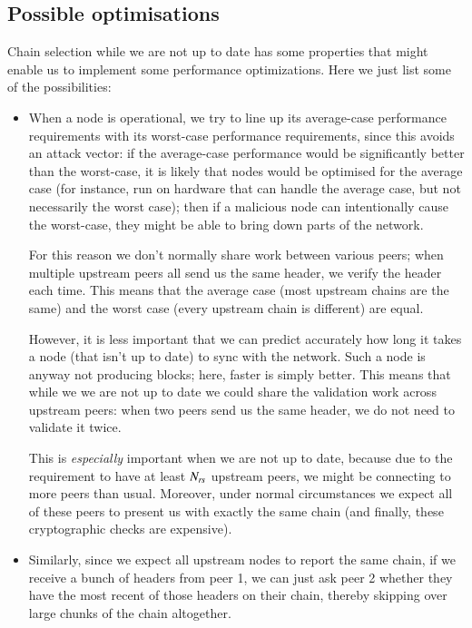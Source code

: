 \subsection{Possible optimisations}
\label{genesis:optimizations}

Chain selection while we are not up to date has some properties that might
enable us to implement some performance optimizations. Here we just list some of
the possibilities:

\begin{itemize}

\item When a node is operational, we try to line up its average-case performance
requirements with its worst-case performance requirements, since this avoids
an attack vector: if the average-case performance would be significantly better
than the worst-case, it is likely that nodes would be optimised for the average
case (for instance, run on hardware that can handle the average case, but not
necessarily the worst case); then if a malicious node can intentionally cause
the worst-case, they might be able to bring down parts of the network.

For this reason we don't normally share work between various peers; when
multiple upstream peers all send us the same header, we verify the header
each time. This means that the average case (most upstream chains are the same)
and the worst case (every upstream chain is different) are equal.

\pagebreak

However, it is less important that we can predict accurately how long it takes
a node (that isn't up to date) to sync with the network. Such a node is anyway
not producing blocks; here, faster is simply better. This means that while we
we are not up to date  we could share the validation work across upstream peers:
when two peers send us the same header, we do not need to validate it twice.

This is \emph{especially} important when we are not up to date, because due to
the requirement to have at least $N_\mathit{rs}$ upstream peers, we might be
connecting to more peers than usual. Moreover, under normal circumstances we
expect all of these peers to present us with exactly the same chain (and
finally, these cryptographic checks are expensive).

\item Similarly, since we expect all upstream nodes to report the same chain,
if we receive a bunch of headers from peer 1, we can just ask peer 2
whether they have the most recent of those headers on their chain, thereby
skipping over large chunks of the chain altogether.


\end{itemize}
